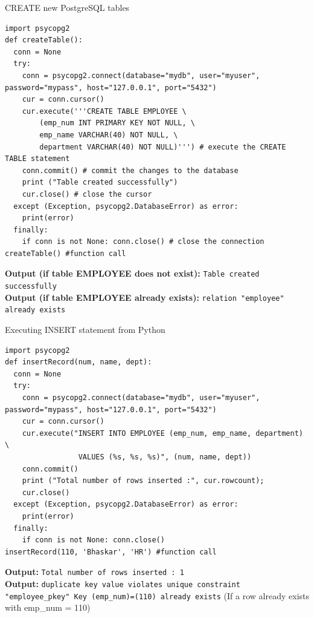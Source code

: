 \documentclass[aspectratio=169, xcolor=dvipsnames]{beamer}
\begin{document}
\begin{frame}[fragile]{CREATE new PostgreSQL tables}
    \begin{verbatim}
import psycopg2
def createTable():
  conn = None
  try:
    conn = psycopg2.connect(database="mydb", user="myuser", password="mypass", host="127.0.0.1", port="5432")
    cur = conn.cursor()
    cur.execute('''CREATE TABLE EMPLOYEE \
        (emp_num INT PRIMARY KEY NOT NULL, \
        emp_name VARCHAR(40) NOT NULL, \
        department VARCHAR(40) NOT NULL)''') # execute the CREATE TABLE statement
    conn.commit() # commit the changes to the database
    print ("Table created successfully")
    cur.close() # close the cursor
  except (Exception, psycopg2.DatabaseError) as error:
    print(error)
  finally:
    if conn is not None: conn.close() # close the connection
createTable() #function call
    \end{verbatim}
    \textbf{Output (if table EMPLOYEE does not exist):} \texttt{Table created successfully} \\
    \textbf{Output (if table EMPLOYEE already exists):} \texttt{relation "employee" already exists}
\end{frame}

\begin{frame}[fragile]{Executing INSERT statement from Python}
    \begin{verbatim}
import psycopg2
def insertRecord(num, name, dept):
  conn = None
  try:
    conn = psycopg2.connect(database="mydb", user="myuser", password="mypass", host="127.0.0.1", port="5432")
    cur = conn.cursor()
    cur.execute("INSERT INTO EMPLOYEE (emp_num, emp_name, department) \
                 VALUES (%s, %s, %s)", (num, name, dept))
    conn.commit()
    print ("Total number of rows inserted :", cur.rowcount);
    cur.close()
  except (Exception, psycopg2.DatabaseError) as error:
    print(error)
  finally:
    if conn is not None: conn.close()
insertRecord(110, 'Bhaskar', 'HR') #function call
    \end{verbatim}
    \textbf{Output:} \texttt{Total number of rows inserted : 1} \\
    \textbf{Output:} \texttt{duplicate key value violates unique constraint "employee\_pkey" Key (emp\_num)=(110) already exists} (If a row already exists with emp\_num = 110)
\end{frame}
\end{document}
